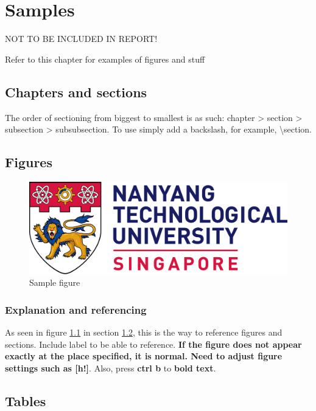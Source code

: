 \newpage
\chapter{Samples}
NOT TO BE INCLUDED IN REPORT!

Refer to this chapter for examples of figures and stuff

\section{Chapters and sections}
The order of sectioning from biggest to smallest is as such: chapter > section > subsection > subsubsection. To use simply add a backslash, for example, \textbackslash section.

\section{Figures}
\label{sample_figures}
\begin{figure}[h!]
    \centering
    \includegraphics[scale=0.8, ]{assets/ntu_logo.png}
    \caption{Sample figure} 
    \label{fig:samp_fig}
\end{figure}

\subsection{Explanation and referencing}
As seen in figure \ref{fig:samp_fig} in section \ref{sample_figures}, this is the way to reference figures and sections. Include label to be able to reference. \textbf{If the figure does not appear exactly at the place specified, it is normal. Need to adjust figure settings such as [h!]}. Also, press \textbf{ctrl b} to \textbf{bold text}.

\section{Tables}

